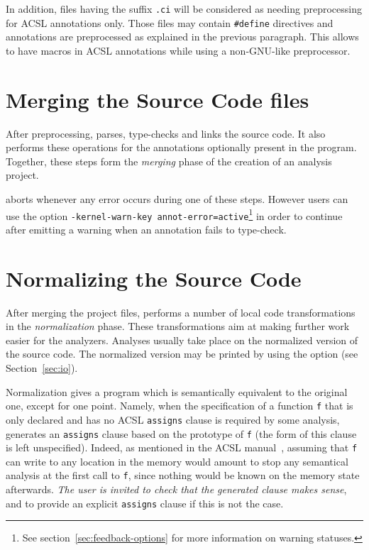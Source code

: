 In addition, files having the suffix \texttt{.ci} will be considered as needing
preprocessing for ACSL annotations only. Those files may contain
\texttt{\#define} directives and annotations are preprocessed as explained in
the previous paragraph. This allows to have macros in ACSL annotations while
using a non-GNU-like preprocessor.

\section{Merging the Source Code files}

After preprocessing, \FramaC parses, type-checks and links the source
code.  It also performs these operations for the \acsl annotations
optionally present in the program. Together, these steps form the
\emph{merging} phase of the creation of an analysis project.

\FramaC aborts whenever any error occurs during one of these steps. However
users can use the option
\texttt{-kernel-warn-key annot-error=active}\footnote{%
See section~\ref{sec:feedback-options} for more information on warning statuses.}
in order to
continue after emitting a warning when an \acsl annotation fails to type-check.

\section{Normalizing the Source Code}\label{sec:normalize}

After merging the project files, \FramaC performs
a number of local code transformations in the \emph{normalization} phase.
These transformations aim at making further work easier for the analyzers.
Analyses usually take place on the normalized version of the source code.
The normalized version may be printed by using
the option  (see Section~\ref{sec:io}).

Normalization gives a program which is semantically equivalent to the
original one, except for one point. Namely, when the specification of
a function \texttt{f} that is only declared and has no ACSL
\texttt{assigns} clause is required by some analysis, \FramaC
generates an \texttt{assigns} clause based on the prototype of
\texttt{f} (the form of this clause is left unspecified). Indeed, as
mentioned in the ACSL manual~\cite{acsl}, assuming that \texttt{f} can
write to any location in the memory would amount to stop any
semantical analysis at the first call to \texttt{f}, since nothing
would be known on the memory state afterwards. \emph{The user is
  invited to check that the generated clause makes sense}, and to
provide an explicit \texttt{assigns} clause if this is not the case.

